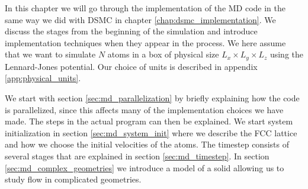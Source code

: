 In this chapter we will go through the implementation of the MD code in the same way we did with DSMC in chapter \ref{chap:dsmc_implementation}. We discuss the stages from the beginning of the simulation and introduce implementation techniques when they appear in the process. We here assume that we want to simulate $N$ atoms in a box of physical size $L_x \times L_y \times L_z$ using the Lennard-Jones potential. Our choice of units is described in appendix \ref{app:physical_units}.

We start with section \ref{sec:md_parallelization} by briefly explaining how the code is parallelized, since this affects many of the implementation choices we have made. The steps in the actual program can then be explained. We start system initialization in section \ref{sec:md_system_init} where we describe the FCC lattice and how we choose the initial velocities of the atoms. The timestep consists of several stages that are explained in section \ref{sec:md_timestep}. In section \ref{sec:md_complex_geometries} we introduce a model of a solid allowing us to study flow in complicated geometries.